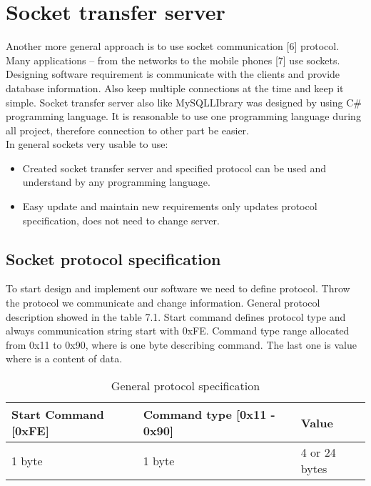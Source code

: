 %
\section{Socket transfer server}

Another more general approach is to use socket communication [6] protocol. Many applications – from the networks to the mobile phones [7] use sockets. Designing software requirement is communicate with the clients and provide database information. Also keep multiple connections at the time and keep it simple.  Socket transfer server also like MySQLLIbrary was designed by using C\# programming language. It is reasonable to use one programming language during all project, therefore connection to other part be easier. \\ In general sockets very usable to use: 

\begin{itemize}
	\item Created socket transfer server and specified protocol can be used and understand by any programming language.
	\item Easy update and maintain new requirements only updates protocol specification, does not need to change server.
\end{itemize}

\subsection{Socket protocol specification}

To start design and implement our software we need to define protocol. Throw the protocol we communicate and change information. General protocol description showed in the table 7.1. Start command defines protocol type and always communication string start with 0xFE. Command type range allocated from 0x11 to 0x90, where is one byte describing command. The last one is value where is a content of data.

\begin{table}[h]
	\centering
    \begin{tabular}{ | p{4cm} | p{5cm} | p{4cm} | }
    \hline
    \textbf{Start Command} [0xFE] & \textbf{Command type} [0x11 - 0x90] & \textbf{Value}  \\ \hline
    1 byte & 1 byte & 4 or 24 bytes  \\ \hline
    \end{tabular}
	\caption{General protocol specification}
	\label{tab:protocolSpec}
\end{table}

